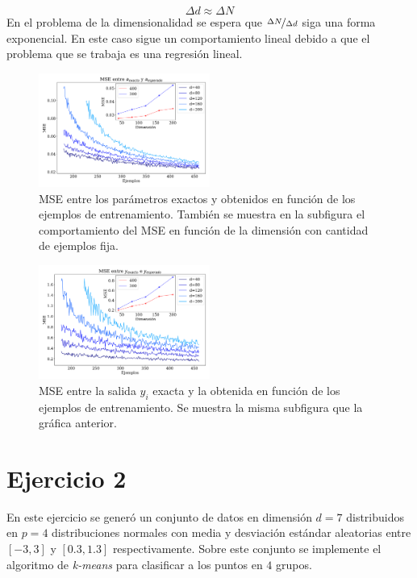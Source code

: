 \begin{equation}
    \Delta d \approx \Delta N  
\end{equation}
En el problema  de la dimensionalidad se espera que $\nicefrac{\Delta N}{\Delta  d}$ siga una forma exponencial. En este caso sigue un comportamiento lineal debido a que el problema que se trabaja es una regresión lineal. 



    \begin{figure}[H]
        \centering
        \includegraphics[width=0.5\textwidth]{plots/ejer_1_mse_a_ejemplos.pdf}
        \caption{MSE entre los parámetros exactos y obtenidos en función de los ejemplos de entrenamiento. También se muestra en la subfigura el comportamiento del MSE en función de la dimensión con cantidad de ejemplos fija.}
        \label{fig:ejer1_a_ejemplos}
    \end{figure}


    \begin{figure}[H]
        \centering
        \includegraphics[width=0.5\textwidth]{plots/ejer_1_mse_y_ejemplos.pdf}
        \caption{MSE entre la salida $y_i$ exacta y la obtenida en función de los ejemplos de entrenamiento. Se  muestra la misma subfigura que la gráfica anterior.}
        \label{fig:ejer1_y_ejemplos}
    \end{figure}

    \section*{Ejercicio 2}

    En este ejercicio se generó un conjunto de datos en dimensión $d=7$ distribuidos en $p=4$ distribuciones normales con media y desviación estándar aleatorias entre $[-3, 3]$ y $[0.3,1.3]$ respectivamente.   Sobre este conjunto se implemente el algoritmo de \emph{k-means} para clasificar a los puntos en $4$ grupos.
    
